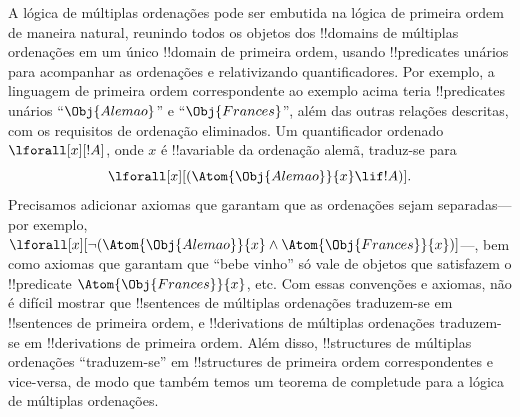 \documentclass[../../../include/open-logic-section]{subfiles}
\begin{document}
A lógica de múltiplas ordenações pode ser embutida na lógica de primeira ordem de
maneira natural, reunindo todos os objetos dos !!{domain}s de múltiplas ordenações
em um único !!{domain} de primeira ordem, usando !!{predicate}s unários para acompanhar
as ordenações e relativizando quantificadores. Por exemplo, a linguagem de primeira ordem
correspondente ao exemplo acima teria !!{predicate}s unários
``$\Obj{Alemao}$'' e ``$\Obj{Frances}$'', além das outras relações
descritas, com os requisitos de ordenação eliminados. Um quantificador ordenado $\lforall[x][!A]$, onde $x$ é !!a{variable} da ordenação alemã, traduz-se para
\[
\lforall[x][(\Atom{\Obj{Alemao}}{x} \lif !A)].
\]
Precisamos adicionar axiomas que garantam que as ordenações sejam separadas---por exemplo,
$\lforall[x][\lnot (\Atom{\Obj{Alemao}}{x} \land
  \Atom{\Obj{Frances}}{x})]$---, bem como axiomas que garantam que
``bebe vinho'' só vale de objetos que satisfazem o !!{predicate}
$\Atom{\Obj{Frances}}{x}$, etc. Com essas convenções e axiomas, não
é difícil mostrar que !!{sentence}s de múltiplas ordenações traduzem-se em
!!{sentence}s de primeira ordem, e !!{derivation}s de múltiplas ordenações traduzem-se
em !!{derivation}s de primeira ordem. Além disso, !!{structure}s de múltiplas ordenações
``traduzem-se'' em !!{structure}s de primeira ordem correspondentes e
vice-versa, de modo que também temos um teorema de completude para a lógica de múltiplas ordenações.
\end{document}
